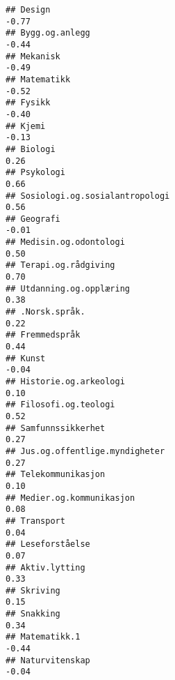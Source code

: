 \documentclass[
]{article}
\begin{document}
\begin{verbatim}
## Design                                                                           -0.77
## Bygg.og.anlegg                                                                   -0.44
## Mekanisk                                                                         -0.49
## Matematikk                                                                       -0.52
## Fysikk                                                                           -0.40
## Kjemi                                                                            -0.13
## Biologi                                                                           0.26
## Psykologi                                                                         0.66
## Sosiologi.og.sosialantropologi                                                    0.56
## Geografi                                                                         -0.01
## Medisin.og.odontologi                                                             0.50
## Terapi.og.rådgiving                                                               0.70
## Utdanning.og.opplæring                                                            0.38
## .Norsk.språk.                                                                     0.22
## Fremmedspråk                                                                      0.44
## Kunst                                                                            -0.04
## Historie.og.arkeologi                                                             0.10
## Filosofi.og.teologi                                                               0.52
## Samfunnssikkerhet                                                                 0.27
## Jus.og.offentlige.myndigheter                                                     0.27
## Telekommunikasjon                                                                 0.10
## Medier.og.kommunikasjon                                                           0.08
## Transport                                                                         0.04
## Leseforståelse                                                                    0.07
## Aktiv.lytting                                                                     0.33
## Skriving                                                                          0.15
## Snakking                                                                          0.34
## Matematikk.1                                                                     -0.44
## Naturvitenskap                                                                   -0.04

\end{verbatim}
\end{document}
